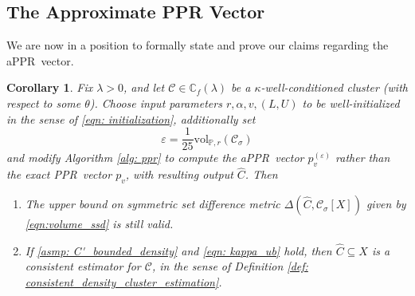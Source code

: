\documentclass[11pt,twoside]{article}
\newtheorem{corollary}{Corollary}
\newcommand{\vol}{\mathrm{vol}}
\newcommand{\1}{\mathbf{1}}
\newcommand{\pbf}{p}        %
\newcommand{\Xbf}{X}             %
\newcommand{\Pbb}{\mathbb{P}}
\newcommand{\Cbb}{\mathbb{C}}
\newcommand{\Cset}{\mathcal{C}}
\newcommand{\Csig}{\Cset_{\sigma}}
\newcommand{\Cest}{\widehat{C}}
\newcommand{\pprspace}{{\sc PPR~}}
\begin{document}
\subsection{The Approximate PPR Vector}
\label{sec:appr}
We are now in a position to formally state and prove our claims regarding the a\pprspace vector. 
\begin{corollary}
	\label{cor: appr}
	Fix $\lambda > 0$, and let $\Cset \in \Cbb_f(\lambda)$ be a $\kappa$-well-conditioned cluster (with respect to some $\theta$). Choose input parameters $r, \alpha, v, (L,U)$ to be well-initialized in the sense of \eqref{eqn: initialization}, additionally set 
	\begin{equation}
	\label{eqn: appr_parameter}
	\varepsilon = \frac{1}{25}\vol_{\Pbb,r}(\Csig)
	\end{equation}
	and modify Algorithm \ref{alg: ppr} to compute the a\pprspace vector $\pbf^{(\varepsilon)}_v$ rather than the exact \pprspace vector $\pbf_v$, with resulting output $\Cest$. Then
	\begin{enumerate}
		\item The upper bound on symmetric set difference metric $\Delta(\Cest,\Csig[\Xbf])$ given by \eqref{eqn:volume_ssd} is still valid.
		\item If \ref{asmp: C'_bounded_density} and \eqref{eqn: kappa_ub} hold, 
		then $\Cest \subseteq \Xbf$ is a consistent estimator for $\Cset$, in the sense of Definition \ref{def: consistent_density_cluster_estimation}.
	\end{enumerate}
\end{corollary}
\end{document}

